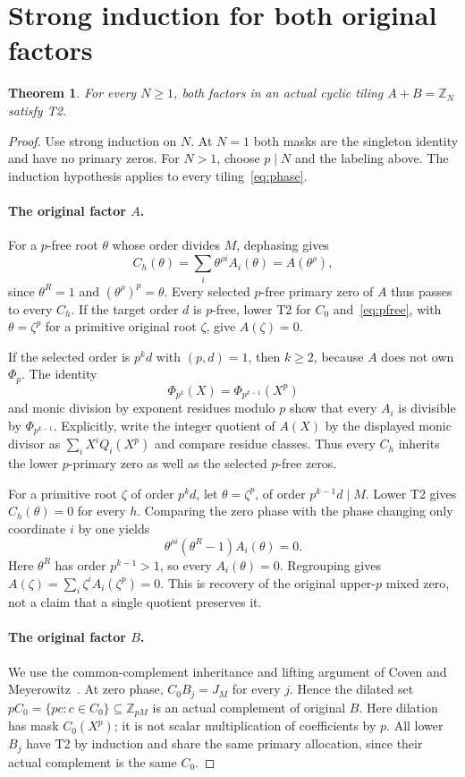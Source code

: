 \documentclass[11pt]{article}
\newtheorem{theorem}{Theorem}
\newcommand{\Z}{\mathbb Z}
\newcommand{\PhiC}{\Phi}
\begin{document}
\section{Strong induction for both original factors}
\begin{theorem}\label{thm:cyclic}
For every $N\ge1$, both factors in an actual cyclic tiling $A+B=\Z_N$ satisfy T2.
\end{theorem}
\begin{proof}
Use strong induction on $N$. At $N=1$ both masks are the singleton identity and have no primary zeros. For $N>1$, choose $p\mid N$ and the labeling above. The induction hypothesis applies to every tiling~\eqref{eq:phase}.

\paragraph{The original factor $A$.}
For a $p$-free root $\theta$ whose order divides $M$, dephasing gives
\begin{equation}\label{eq:pfree}
 C_h(\theta)=\sum_i\theta^{\rho i}A_i(\theta)=A(\theta^\rho),
\end{equation}
since $\theta^R=1$ and $(\theta^\rho)^p=\theta$. Every selected $p$-free primary zero of $A$ thus passes to every $C_h$. If the target order $d$ is $p$-free, lower T2 for $C_0$ and~\eqref{eq:pfree}, with $\theta=\zeta^p$ for a primitive original root $\zeta$, give $A(\zeta)=0$.

If the selected order is $p^kd$ with $(p,d)=1$, then $k\ge2$, because $A$ does not own $\PhiC_p$. The identity
\[
 \PhiC_{p^k}(X)=\PhiC_{p^{k-1}}(X^p)
\]
and monic division by exponent residues modulo $p$ show that every $A_i$ is divisible by $\PhiC_{p^{k-1}}$. Explicitly, write the integer quotient of $A(X)$ by the displayed monic divisor as $\sum_iX^iQ_i(X^p)$ and compare residue classes. Thus every $C_h$ inherits the lower $p$-primary zero as well as the selected $p$-free zeros.

For a primitive root $\zeta$ of order $p^kd$, let $\theta=\zeta^p$, of order $p^{k-1}d\mid M$. Lower T2 gives $C_h(\theta)=0$ for every $h$. Comparing the zero phase with the phase changing only coordinate $i$ by one yields
\[
 \theta^{\rho i}(\theta^R-1)A_i(\theta)=0.
\]
Here $\theta^R$ has order $p^{k-1}>1$, so every $A_i(\theta)=0$. Regrouping gives $A(\zeta)=\sum_i\zeta^i A_i(\zeta^p)=0$. This is recovery of the original upper-$p$ mixed zero, not a claim that a single quotient preserves it.

\paragraph{The original factor $B$.}
We use the common-complement inheritance and lifting argument of Coven and Meyerowitz~\cite[Lemma~2.5]{CM}.
At zero phase, $C_0B_j=J_M$ for every $j$. Hence the dilated set $pC_0=\{pc:c\in C_0\}\subseteq\Z_{pM}$ is an actual complement of original $B$. Here dilation has mask $C_0(X^p)$; it is not scalar multiplication of coefficients by $p$. All lower $B_j$ have T2 by induction and share the same primary allocation, since their actual complement is the same $C_0$.


\end{proof}
\end{document}
